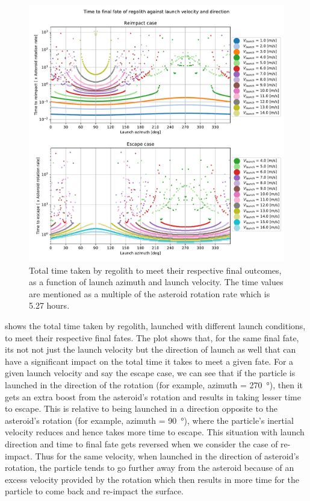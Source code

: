 \begin{figure}[htb]
\centering
\captionsetup{justification=centering}
\includegraphics[width=\textwidth, height=\textheight, keepaspectratio=true]{Images/longest_edge_no_perturbations/time_to_final_fate_all_velocities_newLegend.pdf}
\caption{Total time taken by regolith to meet their respective final outcomes, as a function of launch azimuth and launch velocity. The time values are mentioned as a multiple of the asteroid rotation rate which is 5.27 hours.}
\label{fig:final_fate_time_noSP}
\end{figure}
\FloatBarrier
 shows the total time taken by regolith, launched with different launch conditions, to meet their respective final fates. The plot shows that, for the same final fate, its not not just the launch velocity but the direction of launch as well that can have a significant impact on the total time it takes to meet a given fate. For a given launch velocity and say the escape case, we can see that if the particle is launched in the direction of the rotation (for example, azimuth = \SI{270}{\degree}), then it gets an extra boost from the asteroid's rotation and results in taking lesser time to escape. This is relative to being launched in a direction opposite to the asteroid's rotation (for example, azimuth = \SI{90}{\degree}), where the particle's inertial velocity reduces and hence takes more time to escape. This situation with launch direction and time to final fate gets reversed when we consider the case of re-impact. Thus for the same velocity, when launched in the direction of asteroid's rotation, the particle tends to go further away from the asteroid because of an excess velocity provided by the rotation which then results in more time for the particle to come back and re-impact the surface.
